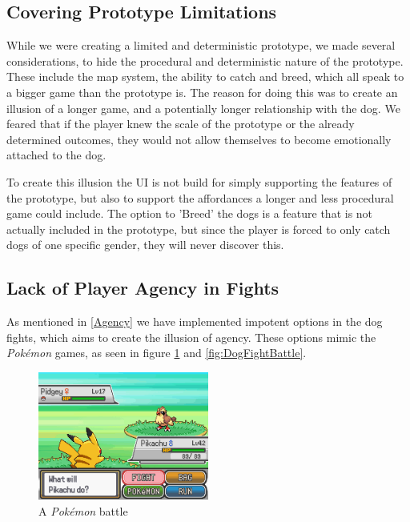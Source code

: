 




\subsection{Covering Prototype Limitations}
\label{limitations}
While we were creating a limited and deterministic prototype, we made several considerations, to hide the procedural and deterministic nature of the prototype. These include the map system, the ability to catch and breed, which all speak to a bigger game than the prototype is. The reason for doing this was to create an illusion of a longer game, and a potentially longer relationship with the dog. We feared that if the player knew the scale of the prototype or the already determined outcomes, they would not allow themselves to become emotionally attached to the dog. \

To create this illusion the UI is not build for simply supporting the features of the prototype, but also to support the affordances a longer and less procedural game could include. The option to 'Breed' the dogs is a feature that is not actually included in the prototype, but since the player is forced to only catch dogs of one specific gender, they will never discover this.\

\subsection{Lack of Player Agency in Fights}
As mentioned in \ref{Agency} we have implemented impotent options in the dog fights, which aims to create the illusion of agency. These options mimic the \textit{Pokémon} games, as seen in figure \ref{fig:PokeBattle} and \ref{fig:DogFightBattle}. 

\begin{figure}[h!] 
	\centering
    \includegraphics[width=0.5\textwidth]{PokemonBattle.png}
    \caption{A \textit{Pokémon} battle}
    \label{fig:PokeBattle}
\end{figure}

